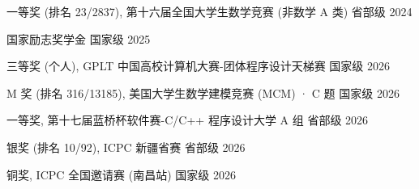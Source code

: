 \begin{cvhonors}
  \cvhonor
    {一等奖 (排名 23/2837),} %
    {第十六届全国大学生数学竞赛 (非数学 A 类)} %
    {省部级} %
    {2024} %

  \cvhonor
    {国家励志奖学金} %
    {} %
    {国家级} %
    {2025} %

  \cvhonor
    {三等奖 (个人),} %
    {GPLT 中国高校计算机大赛-团体程序设计天梯赛} %
    {国家级} %
    {2026} %

  \cvhonor
    {M 奖 (排名 316/13185),} %
    {美国大学生数学建模竞赛 (MCM) · C 题} %
    {国家级} %
    {2026} %

  \cvhonor
    {一等奖,} %
    {第十七届蓝桥杯软件赛-C/C++ 程序设计大学 A 组} %
    {省部级} %
    {2026} %

  \cvhonor
    {银奖 (排名 10/92),} %
    {ICPC 新疆省赛} %
    {省部级} %
    {2026} %

  \cvhonor
    {铜奖,} %
    {ICPC 全国邀请赛 (南昌站)} %
    {国家级} %
    {2026} %

\end{cvhonors}
